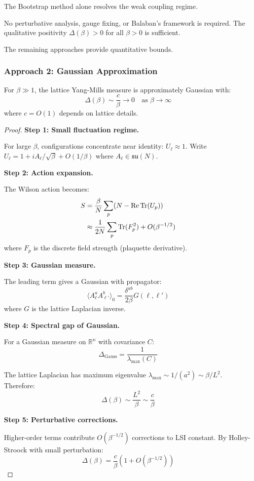 \begin{remark}
\label{rmk:bootstrap-suffices}
The Bootstrap method alone resolves the weak coupling regime.

No perturbative analysis, gauge fixing, or Balaban's framework is required.
The qualitative positivity $\Delta(\beta) > 0$ for all $\beta > 0$ is sufficient.

The remaining approaches provide quantitative bounds.
\end{remark}

\subsubsection{Approach 2: Gaussian Approximation}

\begin{theorem}
\label{thm:weak-gaussian}
For $\beta \gg 1$, the lattice Yang-Mills measure is approximately Gaussian with:
\[
\Delta(\beta) \sim \frac{c}{\beta} \to 0 \quad \text{as } \beta \to \infty
\]
where $c = O(1)$ depends on lattice details.
\end{theorem}

\begin{proof}
\textbf{Step 1: Small fluctuation regime.}

For large $\beta$, configurations concentrate near identity: $U_\ell \approx 1$.
Write $U_\ell = 1 + iA_\ell/\sqrt{\beta} + O(1/\beta)$ where $A_\ell \in \mathfrak{su}(N)$.

\textbf{Step 2: Action expansion.}

The Wilson action becomes:
\begin{align*}
S &= \frac{\beta}{N} \sum_p (N - \operatorname{Re}\operatorname{Tr}(U_p)) \\
&\approx \frac{1}{2N} \sum_p \operatorname{Tr}(F_p^2) + O(\beta^{-1/2})
\end{align*}
where $F_p$ is the discrete field strength (plaquette derivative).

\textbf{Step 3: Gaussian measure.}

The leading term gives a Gaussian with propagator:
\[
\langle A_\ell^a A_{\ell'}^b \rangle_0 = \frac{\delta^{ab}}{2\beta} G(\ell, \ell')
\]
where $G$ is the lattice Laplacian inverse.

\textbf{Step 4: Spectral gap of Gaussian.}

For a Gaussian measure on $\mathbb{R}^n$ with covariance $C$:
\[
\Delta_{\text{Gauss}} = \frac{1}{\lambda_{\max}(C)}
\]

The lattice Laplacian has maximum eigenvalue $\lambda_{\max} \sim 1/(a^2) \sim \beta/L^2$.
Therefore:
\[
\Delta(\beta) \sim \frac{L^2}{\beta} \sim \frac{c}{\beta}
\]

\textbf{Step 5: Perturbative corrections.}

Higher-order terms contribute $O(\beta^{-1/2})$ corrections to LSI constant.
By Holley-Stroock with small perturbation:
\[
\Delta(\beta) = \frac{c}{\beta}(1 + O(\beta^{-1/2}))
\]
\end{proof}

